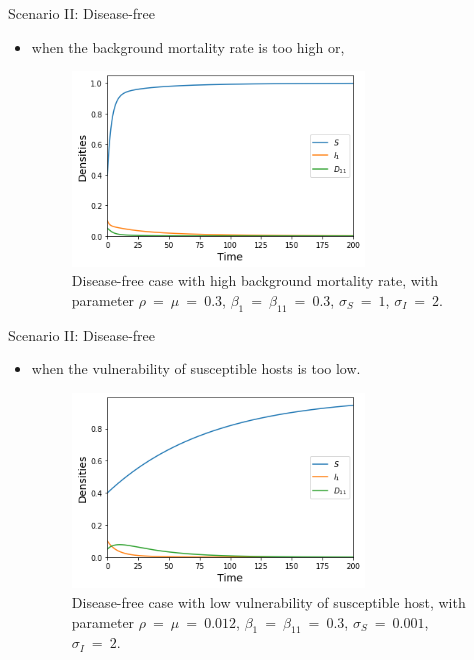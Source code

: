 \documentclass{beamer}
\begin{document}
	\begin{frame}{Scenario II: Disease-free}
		\begin{itemize}
			\item when the background mortality rate is too high or,
			\vspace{1em}
			\begin{figure}[ht]
				\label{Figure 6}
				\begin{center}
					\includegraphics[width=220pt]{disease-free_with_very_high_background_mortality_rate.jpg}
				\end{center}
				\caption{Disease-free case with high background mortality rate, with parameter $\rho\ =\ \mu\ =\ 0.3$, $\beta_1\ =\ \beta_{11}\ =\ 0.3$, $\sigma_S\ =\ 1$, $\sigma_I\ =\ 2$.}
			\end{figure}
		\end{itemize}
	\end{frame}

	\begin{frame}{Scenario II: Disease-free}
		\begin{itemize}
			\item when the vulnerability of susceptible hosts is too low.
			\vspace{1em}
			\begin{figure}[ht]
				\label{Figure 7}
				\begin{center}
					\includegraphics[width=220pt]{disease-free_with_low_sv.jpg}
				\end{center}
				\caption{Disease-free case with low vulnerability of susceptible host, with parameter $\rho\ =\ \mu\ =\ 0.012$, $\beta_1\ =\ \beta_{11}\ =\ 0.3$, $\sigma_S\ =\ 0.001$, $\sigma_I\ =\ 2$.}
			\end{figure}
		\end{itemize}
	\end{frame}
\end{document}
